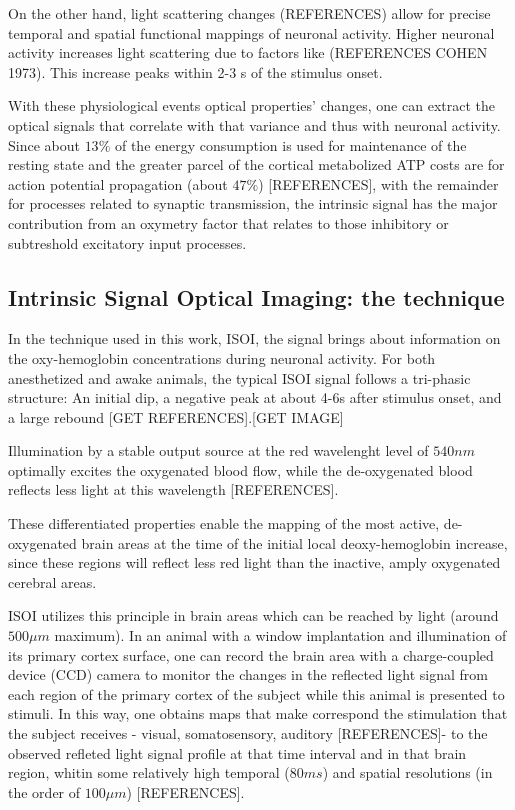 On the other hand, light scattering changes (REFERENCES) allow for precise temporal and spatial functional mappings of neuronal activity. Higher neuronal activity increases light scattering due to factors like (REFERENCES COHEN 1973). This increase peaks within 2-3 s of the stimulus onset.

With these physiological events optical properties' changes, one can extract the optical signals that correlate with that variance and thus with neuronal activity. Since about $13\%$ of the energy consumption is used for maintenance of the resting state and the greater parcel of the cortical metabolized ATP costs are for action potential propagation (about $47\%$) [REFERENCES], with the remainder for processes related to synaptic transmission, the intrinsic signal has the major contribution from an oxymetry factor that relates to those inhibitory or subtreshold excitatory input processes.

\subsection{Intrinsic Signal Optical Imaging: the technique}

In the technique used in this work, ISOI, the signal brings about information on the oxy-hemoglobin concentrations during neuronal activity. For both anesthetized and awake animals, the typical ISOI signal follows a tri-phasic structure: An initial dip, a negative peak at about 4-6s after stimulus onset, and a large rebound [GET REFERENCES].[GET IMAGE] 

Illumination by a stable output source at the red wavelenght level of $540 nm$ optimally excites the oxygenated blood flow, while the de-oxygenated blood reflects less light at this wavelength [REFERENCES]. 

These differentiated properties enable the mapping of the most active, de-oxygenated brain areas at the time of the initial local deoxy-hemoglobin increase, since these regions will reflect less red light than the inactive, amply oxygenated cerebral areas.

ISOI utilizes this principle in brain areas which can be reached by light (around $500 \mu m$ maximum). In an animal with a window implantation and illumination of its primary cortex surface, one can record the brain area with a charge-coupled device (CCD) camera to monitor the changes in the reflected light signal from each region of the primary cortex of the subject while this animal is presented to stimuli. In this way, one obtains maps that make correspond the stimulation that the subject receives - visual, somatosensory, auditory [REFERENCES]- to the observed refleted light signal profile at that time interval and in that brain region, whitin some relatively high temporal ($80 ms$) and spatial resolutions (in the order of $100 \mu m$) [REFERENCES].

